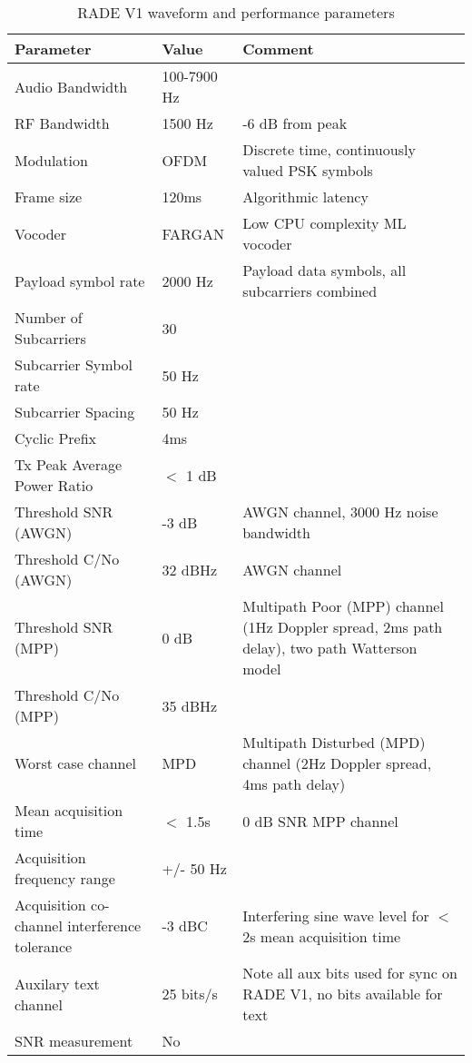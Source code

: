 \documentclass{article}
\begin{document}
\begin{table}[H]
\centering
\begin{tabular}{m{4cm} | m{2cm} | m{5cm} }
 \hline
 Parameter & Value & Comment \\
 \hline
 Audio Bandwidth & 100-7900 Hz \\
 RF Bandwidth & 1500 Hz & -6 dB from peak \\
 Modulation & OFDM & Discrete time, continuously valued PSK symbols \\
 Frame size & 120ms & Algorithmic latency \\
 Vocoder & FARGAN & Low CPU complexity ML vocoder \\
 Payload symbol rate & 2000 Hz & Payload data symbols, all subcarriers combined \\
 Number of Subcarriers & 30 \\
 Subcarrier Symbol rate & 50 Hz \\
 Subcarrier Spacing & 50 Hz \\
 Cyclic Prefix & 4ms \\
 Tx Peak Average Power Ratio & $<$ 1 dB \\
 Threshold SNR (AWGN) & -3 dB & AWGN channel, 3000 Hz noise bandwidth \\
 Threshold C/No (AWGN) & 32 dBHz & AWGN channel \\
 Threshold SNR (MPP) & 0 dB & Multipath Poor (MPP) channel (1Hz Doppler spread, 2ms path delay), two path Watterson model \\
 Threshold C/No (MPP) & 35 dBHz  \\
  Worst case channel & MPD & Multipath Disturbed (MPD) channel (2Hz Doppler spread, 4ms path delay) \\
 Mean acquisition time & $<$ 1.5s & 0 dB SNR MPP channel \\
 Acquisition frequency range & +/- 50 Hz \\
 Acquisition co-channel interference tolerance & -3 dBC & Interfering sine wave level for $<$ 2s mean acquisition time \\
 Auxilary text channel & 25 bits/s & Note all aux bits used for sync on RADE V1, no bits available for text \\
 SNR measurement & No \\
\hline
\end{tabular}
\caption{RADE V1 waveform and performance parameters}
\label{tab:constant_eb}
\end{table}
\end{document}
